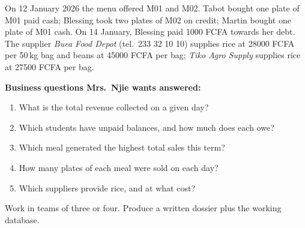 \documentclass[11pt]{article}
\newcounter{popsec}
\newcounter{popsub}
\newcommand{\courssub}[1]{%
  \stepcounter{popsub}%
  \par\vspace{9pt}\noindent{\popxbold\fontsize{11.5}{13}\selectfont\color{popink}{\color{poporange}\thepopsec.\thepopsub}\hspace{6pt}#1}\par\nopagebreak\vspace{4pt}
}
\begin{document}
On 12 January 2026 the menu offered M01 and M02. Tabot bought one plate of M01 paid cash; Blessing took two plates of M02 on credit; Martin bought one plate of M01 cash. On 14 January, Blessing paid 1000 FCFA towards her debt. The supplier \emph{Buea Food Depot} (tel.\ 233 32 10 10) supplies rice at 28000 FCFA per 50\,kg bag and beans at 45000 FCFA per bag; \emph{Tiko Agro Supply} supplies rice at 27500 FCFA per bag.

\textbf{Business questions Mrs.\ Njie wants answered:}
\begin{enumerate}
\item What is the total revenue collected on a given day?
\item Which students have unpaid balances, and how much does each owe?
\item Which meal generated the highest total sales this term?
\item How many plates of each meal were sold on each day?
\item Which suppliers provide rice, and at what cost?
\end{enumerate}

\courssub{Tasks}

Work in teams of three or four. Produce a written dossier plus the working database.
\end{document}
